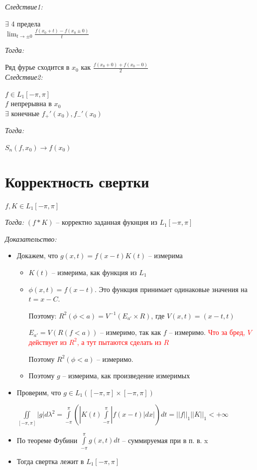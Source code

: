 \documentclass[paper=a4, fontsize=17pt]{article}
\begin{document}
\emph{Следствие1:}

$ \exists $ 4 предела\\
$ \lim_{t \to \pm 0} \frac{f(x_0 + t) - f(x_0 \pm 0)}{t} $

\emph{Тогда:}

Ряд фурье сходится в $ x_0 $ как $ \frac{f(x_0 + 0) + f(x_0 - 0)}{2} $\\

\emph{Следствие2:}

$ f \in L_1[-\pi, \pi] $\\
$ f $ непрерывна в  $ x_0 $\\
$ \exists $ конечные $ f_{+}'(x_0), f_{-}'(x_0) $

\emph{Тогда:}

$ S_n(f, x_0) \to f(x_0) $

\section{Корректность свертки}

$ f, K \in L_1[-\pi, \pi] $

\emph{Тогда:} $ (f * K)$ -- корректно заданная фукнция из $ L_1[-\pi, \pi] $

\emph{Доказательство:}

\begin{itemize}
	\item Докажем, что $ g(x, t) = f(x - t)K(t) $ -- измерима
		\begin{itemize}
			\item $ K(t) $ -- измерима, как функция из $ L_1 $
			\item $ \phi(x, t) = f(x - t) $. Это функция принимает одинаковые значения на $ t = x - C $.

			Поэтому: $ R^2(\phi < a) = V^{-1}(E_{a'} \times R)$, где $ V(x, t) = (x - t, t) $

			$ E_{a'} = V(R(f < a)) $ -- измеримо, так как $ f $ -- измеримо.
			\textcolor{red}{Что за бред, $V$ действует из $R^2$, а тут пытаются сделать из $R$}

			Поэтому $ R^2(\phi < a) $ -- измеримо.
			\item Поэтому $ g $ -- измерима, как произведение измеримых
		\end{itemize}

	\item Проверим, что $ g \in L_1([-\pi, \pi]\times[-\pi, \pi]) $

		$ \iint\limits_{[-\pi, \pi]} | g | d\lambda^2 =
		  \int\limits_{-\pi}^{\pi} (|K(t)  \int\limits_{-\pi}^{\pi} | f(x-t)| dx |) dt =
		  ||f||_1 ||K||_1 < +\infty $
	\item По теореме Фубини $ \int\limits_{-\pi}^{\pi} g(x, t) dt $ -- суммируемая при в п. в. x

	\item Тогда свертка лежит в $ L_1[-\pi, \pi] $


\end{itemize}
\end{document}
